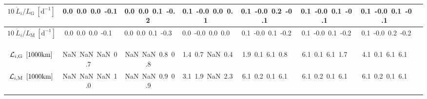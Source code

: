 \begin{table}[H]
{\begin{centering}
\begin{tabular}{|c|c|c|c|c|c|c|c|}
\hline
$10\ \dot{L}_{i}/L_{\mathrm{G}}\ \left[\mathrm{d^{-1}}\right]$ & \textcolor{C1}{0.0}\ \textcolor{C2}{0.0}\ \textcolor{C3}{0.0}\ \textcolor{C4}{-0.1}\  & \textcolor{C1}{0.0}\ \textcolor{C2}{0.0}\ \textcolor{C3}{0.1}\ \textcolor{C4}{-0.2}\  & \textcolor{C1}{0.1}\ \textcolor{C2}{-0.0}\ \textcolor{C3}{0.0}\ \textcolor{C4}{0.1}\  & \textcolor{C1}{0.1}\ \textcolor{C2}{-0.0}\ \textcolor{C3}{0.2}\ \textcolor{C4}{-0.1}\  & \textcolor{C1}{0.1}\ \textcolor{C2}{-0.0}\ \textcolor{C3}{0.1}\ \textcolor{C4}{-0.1}\  & \textcolor{C1}{0.1}\ \textcolor{C2}{-0.0}\ \textcolor{C3}{0.1}\ \textcolor{C4}{-0.1}\  \tabularnewline
\hline
$10\ \dot{L}_{i}/L_{\mathrm{M}}\ \left[\mathrm{d^{-1}}\right]$ & \textcolor{C1}{0.0}\ \textcolor{C2}{0.0}\ \textcolor{C3}{0.0}\ \textcolor{C4}{-0.1}\  & \textcolor{C1}{0.0}\ \textcolor{C2}{0.0}\ \textcolor{C3}{0.1}\ \textcolor{C4}{-0.3}\  & \textcolor{C1}{0.0}\ \textcolor{C2}{-0.0}\ \textcolor{C3}{0.0}\ \textcolor{C4}{0.0}\  & \textcolor{C1}{0.1}\ \textcolor{C2}{-0.0}\ \textcolor{C3}{0.1}\ \textcolor{C4}{-0.2}\  & \textcolor{C1}{0.1}\ \textcolor{C2}{-0.0}\ \textcolor{C3}{0.1}\ \textcolor{C4}{-0.2}\  & \textcolor{C1}{0.1}\ \textcolor{C2}{-0.0}\ \textcolor{C3}{0.2}\ \textcolor{C4}{-0.2}\  \tabularnewline
\hline
${\cal L}_{i,\mathrm{G}}\ \left[1000\mathrm{km}\right]$ & \textcolor{C1}{NaN}\ \textcolor{C2}{NaN}\ \textcolor{C3}{NaN}\ \textcolor{C4}{0.7}\  & \textcolor{C1}{NaN}\ \textcolor{C2}{NaN}\ \textcolor{C3}{0.8}\ \textcolor{C4}{0.8}\  & \textcolor{C1}{1.4}\ \textcolor{C2}{0.7}\ \textcolor{C3}{NaN}\ \textcolor{C4}{0.4}\  & \textcolor{C1}{1.9}\ \textcolor{C2}{0.1}\ \textcolor{C3}{6.1}\ \textcolor{C4}{0.8}\  & \textcolor{C1}{6.1}\ \textcolor{C2}{0.1}\ \textcolor{C3}{6.1}\ \textcolor{C4}{1.7}\  & \textcolor{C1}{4.1}\ \textcolor{C2}{0.1}\ \textcolor{C3}{6.1}\ \textcolor{C4}{6.1}\  \tabularnewline
\hline
${\cal L}_{i,\mathrm{M}}\ \left[1000\mathrm{km}\right]$ & \textcolor{C1}{NaN}\ \textcolor{C2}{NaN}\ \textcolor{C3}{NaN}\ \textcolor{C4}{1.0}\  & \textcolor{C1}{NaN}\ \textcolor{C2}{NaN}\ \textcolor{C3}{0.9}\ \textcolor{C4}{0.9}\  & \textcolor{C1}{3.1}\ \textcolor{C2}{1.9}\ \textcolor{C3}{NaN}\ \textcolor{C4}{2.3}\  & \textcolor{C1}{6.1}\ \textcolor{C2}{0.2}\ \textcolor{C3}{0.1}\ \textcolor{C4}{6.1}\  & \textcolor{C1}{6.1}\ \textcolor{C2}{0.2}\ \textcolor{C3}{0.1}\ \textcolor{C4}{6.1}\  & \textcolor{C1}{6.1}\ \textcolor{C2}{0.2}\ \textcolor{C3}{0.1}\ \textcolor{C4}{6.1}\  \tabularnewline
\hline
 &  &  &  &  &  & \tabularnewline
\hline
\end{tabular}
\par\end{centering} }
\end{table}
